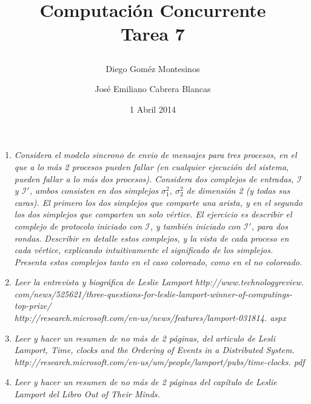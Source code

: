 \documentclass{article}
\title{ Computación Concurrente \\ \Large{Tarea 7}
\author{
  Diego Goméz Montesinos
  \and
  José Emiliano Cabrera Blancas
  }
\date{1 Abril 2014}
}
\begin{document}
\maketitle
\begin{enumerate}
  
  \item{
    \textsl{
      Considera el modelo sincrono de envio de mensajes para tres
      procesos, en el que a lo más 2 procesos pueden fallar (en
      cualquier ejecución del sistema, pueden fallar a lo más dos
      procesos). Considera dos complejos de entradas, $\mathcal{I}$ y
      $\mathcal{I}'$, ambos consisten en dos simplejos $\sigma_{1}^2$,
      $\sigma_{2}^2$ de dimensión 2 (y todas sus caras). El primero
      los dos simplejos que comparte una arista, y en el segundo los
      dos simplejos que comparten un solo vértice. El ejercicio es
      describir el complejo de protocolo iniciado con $\mathcal{I}$, y
      también iniciado con $\mathcal{I}'$, para dos rondas. Describir
      en detalle estos complejos, y la vista de cada proceso en cada
      vértice, explicando intuitivamente el significado de los
      simplejos. Presenta estos complejos tanto en el caso coloreado,
      como en el no coloreado.
    } 
  }

\item{
    \textsl{
      Leer la entrevista y biográfica de Leslie Lamport
      http://www.technologyreview. com/news/525621/three-questions-for-leslie-lamport-winner-of-computings-top-prize/
      \\ http://research.microsoft.com/en-us/news/features/lamport-031814.
aspx 
    }
  }

\item{
    \textsl{
      Leer y hacer un resumen de no más de 2 páginas, del articulo de
      Lesli Lamport, \textit{Time, clocks and the Ordering of Events
        in a Distributed System}. \\
      http://research.microsoft.com/en-us/um/people/lamport/pubs/time-clocks. pdf
    }
  }

  \item{
      \textsl{
        Leer y hacer un resumen de no más de 2 páginas del capítulo de
        Leslie Lamport del Libro Out of Their Minds. \\ 
      }
    }

\end{enumerate}
\end{document}
